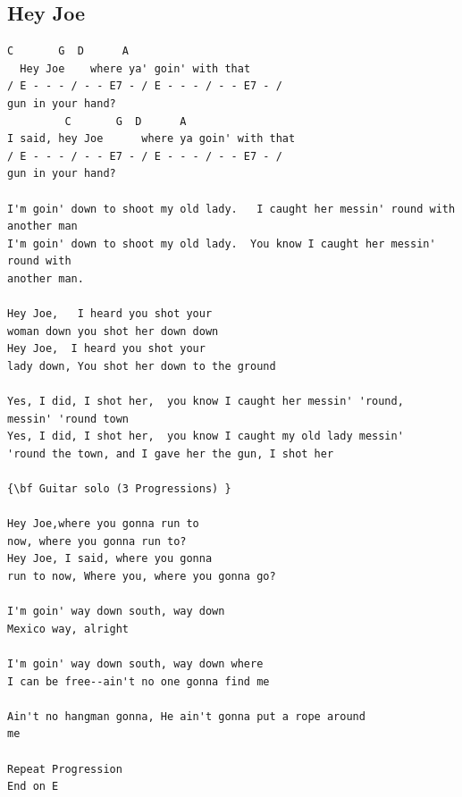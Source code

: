 \documentclass[a4paper]{article}
\begin{document}
\subsection{Hey Joe} %
\label{sub:Hey Joe}
\begin{Verbatim}[commandchars=\\\{\}]
	  C       G  D      A                               
  Hey Joe    where ya' goin' with that  
/ E - - - / - - E7 - / E - - - / - - E7 - / 
gun in your hand? 
         C       G  D      A   
I said, hey Joe      where ya goin' with that  
/ E - - - / - - E7 - / E - - - / - - E7 - / 
gun in your hand?  

I'm goin' down to shoot my old lady.   I caught her messin' round with  
another man  
I'm goin' down to shoot my old lady.  You know I caught her messin' round with  
another man. 

Hey Joe,   I heard you shot your 
woman down you shot her down down 
Hey Joe,  I heard you shot your  
lady down, You shot her down to the ground 

Yes, I did, I shot her,  you know I caught her messin' 'round,  
messin' 'round town 
Yes, I did, I shot her,  you know I caught my old lady messin'  
'round the town, and I gave her the gun, I shot her 

{\bf Guitar solo (3 Progressions) }

Hey Joe,where you gonna run to  
now, where you gonna run to? 
Hey Joe, I said, where you gonna  
run to now, Where you, where you gonna go? 

I'm goin' way down south, way down  
Mexico way, alright 

I'm goin' way down south, way down where  
I can be free--ain't no one gonna find me 

Ain't no hangman gonna, He ain't gonna put a rope around  
me

Repeat Progression 
End on E 
\end{Verbatim}
\newpage
\end{document}
